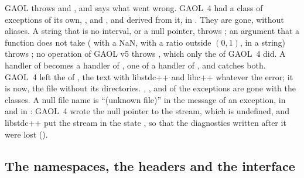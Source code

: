 \documentclass[12pt,a4paper,twoside,openright]{book}
\begin{document}
GAOL throws  and , and
 says what went wrong.\newinvfive{} GAOL~4 had a class of
exceptions of its own, , and
,  and
 derived from it, in
. They are gone, without aliases. A string
that is no interval, or a null pointer, throws ;
an argument that a function does not take ( with a
NaN,  with a ratio outside $(0, 1)$, 
in a string) throws ; no operation of GAOL v5 throws
, which only the  of GAOL~4
did. A handler of  becomes a handler of
, one of  a
handler of , and  catches
both. GAOL~4 left the  of , the text
 with libstdc++ and libc++ whatever the error; it is
 now, the file without its directories.
, ,  and  of
the exceptions are gone with the classes. A null file name is ``(unknown
file)'' in the message of an exception, in  and in
: GAOL~4 wrote the null pointer to the stream, which is
undefined, and libstdc++ put the stream in the state , so that the
diagnostics written after it were lost ().

\subsection{The namespaces, the headers and the interface}
\label{sec:changes-interface}
%
%
\end{document}
